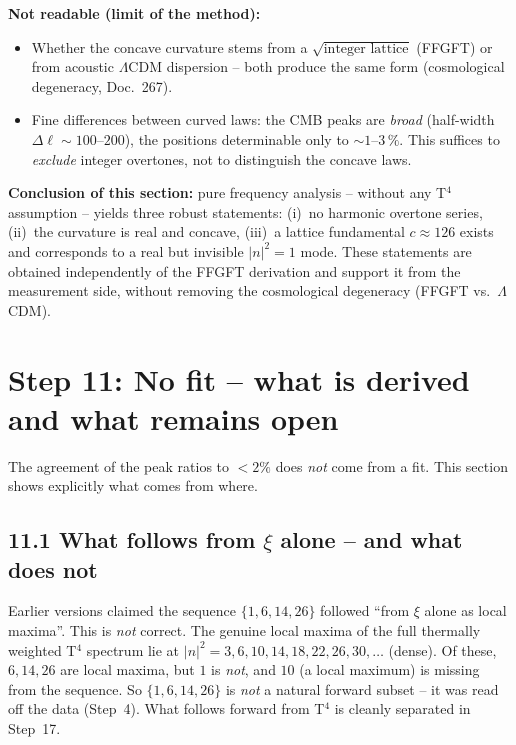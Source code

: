 \textbf{Not readable (limit of the method):}
\begin{itemize}
  \item Whether the concave curvature stems from a
        $\sqrt{\text{integer lattice}}$ (FFGFT) or from acoustic
        $\Lambda$CDM dispersion -- both produce the same form
        (cosmological degeneracy, Doc.~267).
  \item Fine differences between curved laws: the CMB peaks are
        \emph{broad} (half-width $\Delta\ell \sim 100$--$200$), the
        positions determinable only to $\sim 1$--$3\,\%$. This suffices
        to \emph{exclude} integer overtones, not to distinguish the
        concave laws.
\end{itemize}

\textbf{Conclusion of this section:} pure frequency analysis -- without
any T$^4$ assumption -- yields three robust statements: (i)~no harmonic
overtone series, (ii)~the curvature is real and concave, (iii)~a
lattice fundamental $c \approx 126$ exists and corresponds to a real
but invisible $|n|^2{=}1$ mode. These statements are obtained
independently of the FFGFT derivation and support it from the
measurement side, without removing the cosmological degeneracy (FFGFT
vs.\ $\Lambda$CDM).

\section{Step 11: No fit -- what is derived and what remains open}

The agreement of the peak ratios to $< 2\%$ does \emph{not} come from
a fit. This section shows explicitly what comes from where.

\subsection*{11.1 What follows from $\xi$ alone -- and what does not}

\begin{tcolorbox}[colback=red!4!white, colframe=red!55!black,
  title={Correction relative to earlier versions}]
Earlier versions claimed the sequence $\{1,6,14,26\}$ followed ``from $\xi$
alone as local maxima''. This is \emph{not} correct. The genuine local maxima
of the full thermally weighted T$^4$ spectrum lie at
$|n|^2 = 3, 6, 10, 14, 18, 22, 26, 30, \ldots$ (dense). Of these, $6,14,26$
are local maxima, but $1$ is \emph{not}, and $10$ (a local maximum) is missing
from the sequence. So $\{1,6,14,26\}$ is \emph{not} a natural forward subset --
it was read off the data (Step~4). What follows forward from T$^4$ is cleanly
separated in Step~17.
\end{tcolorbox}

